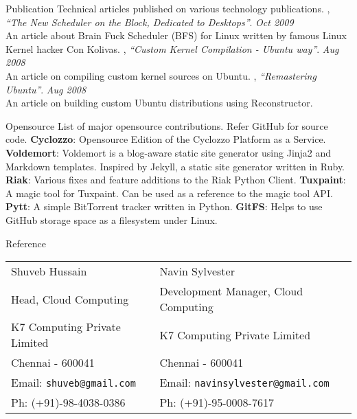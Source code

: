 \documentclass{resume}
\begin{document}
\newpage


\begin{category}{Publication}
  \citemnobullet Technical articles published on various technology publications.
  , {\em ``The New Scheduler on the Block, Dedicated to Desktops''}. \hfill {\em Oct 2009}\\
  An article about Brain Fuck Scheduler (BFS) for Linux written by famous Linux Kernel hacker Con Kolivas.
  , {\em ``Custom Kernel Compilation - Ubuntu way''}. \hfill {\em Aug 2008}\\
  An article on compiling custom kernel sources on Ubuntu.
  , {\em ``Remastering Ubuntu''}. \hfill {\em Aug 2008}\\
  An article on building custom Ubuntu distributions using Reconstructor.
\end{category}


\begin{category}{Opensource}
  \citemnobullet List of major opensource contributions. Refer GitHub for source code.
  \citembullet \textbf{Cyclozzo}: Opensource Edition of the Cyclozzo Platform as a Service.
  \citembullet \textbf{Voldemort}: Voldemort is a blog-aware static site generator using Jinja2 
  and Markdown templates. Inspired by Jekyll, a static site generator written in Ruby.
  \citembullet \textbf{Riak}: Various fixes and feature additions to the Riak Python Client.
  \citembullet \textbf{Tuxpaint}: A magic tool for Tuxpaint. Can be used as a reference to the magic tool API.
  \citembullet \textbf{Pytt}: A simple BitTorrent tracker written in Python.
  \citembullet \textbf{GitFS}: Helps to use GitHub storage space as a filesystem under Linux.
\end{category}


\begin{category}{Reference}
  \citemnobullet \\
  \begin{tabular}{ll}Shuveb Hussain&Navin Sylvester\\
    Head, Cloud Computing&Development Manager, Cloud Computing\\
    K7 Computing Private Limited&K7 Computing Private Limited\\
    Chennai - 600041&Chennai - 600041\\
    Email: \mbox{\small\tt shuveb@gmail.com}&Email: \mbox{\small\tt navinsylvester@gmail.com}\\
    Ph: (+91)-98-4038-0386&Ph: (+91)-95-0008-7617
  \end{tabular}
\end{category}
\end{document}
